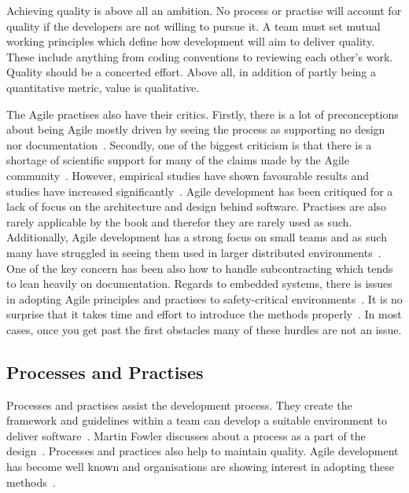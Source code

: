 \documentclass[english]{tktltiki2}
\begin{document}
Achieving quality is above all an ambition. No process or practise will account for quality if the developers are not willing to pursue it. A team must set mutual working principles which define how development will aim to deliver quality. These include anything from coding conventions to reviewing each other’s work. Quality should be a concerted effort. Above all, in addition of partly being a quantitative metric, value is qualitative.

The Agile practises also have their critics. Firstly, there is a lot of preconceptions about being Agile mostly driven by seeing the process as supporting no design nor documentation~\cite{HMP12}. Secondly, one of the biggest criticism is that there is a shortage of scientific support for many of the claims made by the Agile community~\cite{DD08, DNB12}. However, empirical studies have shown favourable results and studies have increased significantly~\cite{DD08, SS10, DNB12}. Agile development has been critiqued for a lack of focus on the architecture and design behind software. Practises are also rarely applicable by the book and therefor they are rarely used as such. Additionally, Agile development has a strong focus on small teams and as such many have struggled in seeing them used in larger distributed environments~\cite{TFR02}. One of the key concern has been also how to handle subcontracting which tends to lean heavily on documentation. Regards to embedded systems, there is issues in adopting Agile principles and practises to safety-critical environments~\cite{TFR02}. It is no surprise that it takes time and effort to introduce the methods properly~\cite{DD08}. In most cases, once you get past the first obstacles many of these hurdles are not an issue.

\subsection{Processes and Practises}

Processes and practises assist the development process. They create the framework and guidelines within a team can develop a suitable environment to deliver software~\cite{Kni07}. Martin Fowler discusses about a process as a part of the design~\cite{Fow05}. Processes and practices also help to maintain quality. Agile development has become well known and organisations are showing interest in adopting these methods~\cite{DD08}.
\end{document}
